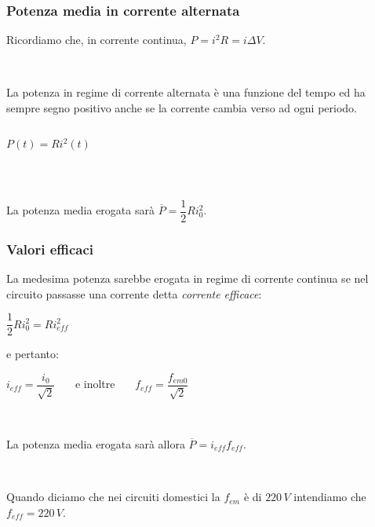 \documentclass[]{beamer}
\theoremstyle{plain}
\newcommand{\fem}{f_{em}}
\newcommand{\femm}{f_{em0}}
\begin{document}
\begin{frame}
\frametitle{Potenza media in corrente alternata}
Ricordiamo che, in corrente continua, $ P = i^2 R = i \Delta V $.\pause

~

\alert<2>{La potenza in regime di corrente alternata} è una funzione del tempo ed \alert<2>{ha sempre segno positivo} anche se la corrente cambia verso ad ogni periodo.
  
  \begin{columns}
\begin{column}{0.25\textwidth}
  $ P(t) = R i^2(t) $
\end{column}
\begin{column}{0.55\textwidth}
\end{column}
\end{columns}\pause

~

La \alert<3>{potenza media} erogata sarà \colorbox{blue!30}{$ \overline{P} = \dfrac{1}{2}R i_0^2 $}.
\end{frame}



\begin{frame}
\frametitle{Valori efficaci}
  La medesima potenza sarebbe erogata in regime di corrente continua se nel circuito passasse una corrente detta \emph{corrente efficace}:
  \begin{center}
  $ \dfrac{1}{2}R i_0^2 = R i_{eff}^2 $
  \end{center}\pause
  e pertanto:
  \begin{center}
\colorbox{blue!30}{$ i_{eff} = \dfrac{i_0}{\sqrt{2}} $}~~~ e inoltre ~~~\colorbox{blue!30}{$ f_{eff} = \dfrac{\femm}{\sqrt{2}} $}
\end{center}\pause

~

La potenza media erogata sarà allora \colorbox{blue!30}{$ \overline{P} = i_{eff} f_{eff} $}.\pause

~

Quando diciamo che nei circuiti domestici la $ \fem $ è di $ 220 \, V $ intendiamo che $ f_{eff} = 220 \, V $.
\end{frame}
\end{document}
